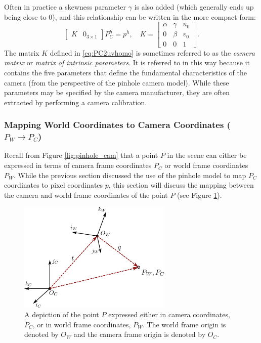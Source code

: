 Often in practice a skewness parameter $\gamma$ is also added (which generally ends up being close to 0), and this relationship can be written in the more compact form:
\begin{equation} \label{eq:PC2uvhomo}
    \begin{bmatrix}
        K & 0_{3 \times 1}
    \end{bmatrix} P_C^h = p^h, \quad K = \begin{bmatrix}
\alpha & \gamma & u_{0} \\
0 & \beta & v_{0}  \\
0 & 0 & 1
\end{bmatrix}.
\end{equation}
The matrix $K$ defined in \eqref{eq:PC2uvhomo} is sometimes referred to as the \textit{camera matrix} or \textit{matrix of intrinsic parameters}. It is referred to in this way because it contains the five parameters that define the fundamental characteristics of the camera (from the perspective of the pinhole camera model). While these parameters may be specified by the camera manufacturer, they are often extracted by performing a camera calibration.


\subsubsection{Mapping World Coordinates to Camera Coordinates ($P_W \xrightarrow{} P_C$)}
Recall from Figure \ref{fig:pinhole_cam} that a point $P$ in the scene can either be expressed in terms of camera frame coordinates $P_C$ or world frame coordinates $P_W$. While the previous section discussed the use of the pinhole model to map $P_C$ coordinates to pixel coordinates $p$, this section will discuss the mapping between the camera and world frame coordinates of the point $P$ (see Figure \ref{fig:Pc2Pw}).
\begin{figure}[ht]
\centering
\includegraphics[width=0.65\textwidth]{tex/figs/ch08_figs/world2camera.png}
\caption{A depiction of the point $P$ expressed either in camera coordinates, $P_C$, or in world frame coordinates, $P_W$. The world frame origin is denoted by $O_W$ and the camera frame origin is denoted by $O_C$.}
\label{fig:Pc2Pw}
\end{figure}


